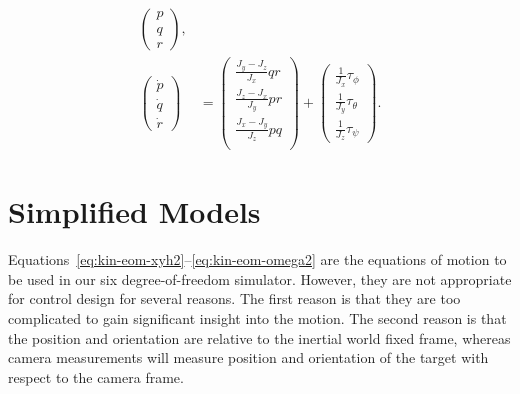 {\begin{align}
    \begin{pmatrix} p \\ q \\ r \end{pmatrix},
    \label{eq:kin-eom-euler2}\\
\begin{pmatrix} \dot{p} \\ \dot{q} \\ \dot{r} \end{pmatrix}
&= \begin{pmatrix}
    \frac{J_y-J_z}{J_x} qr\\
    \frac{J_z-J_x}{J_y} pr\\
    \frac{J_x-J_y}{J_z} pq\\
    \end{pmatrix}
    + \begin{pmatrix}
    \frac{1}{J_x} \tau_{\phi} \\
    \frac{1}{J_y} \tau_{\theta} \\
    \frac{1}{J_z} \tau_{\psi}
    \end{pmatrix}.
    \label{eq:kin-eom-omega2}
\end{align}

\section{Simplified Models}

Equations~\eqref{eq:kin-eom-xyh2}--\eqref{eq:kin-eom-omega2} are the
equations of motion to be used in our six degree-of-freedom
simulator.  However, they are not appropriate for control design for
several reasons. The first reason is that they are too complicated
to gain significant insight into the motion.  The second reason is
that the position and orientation are relative to the inertial world
fixed frame, whereas camera measurements will measure position and
orientation of the target with respect to the camera frame.

}
